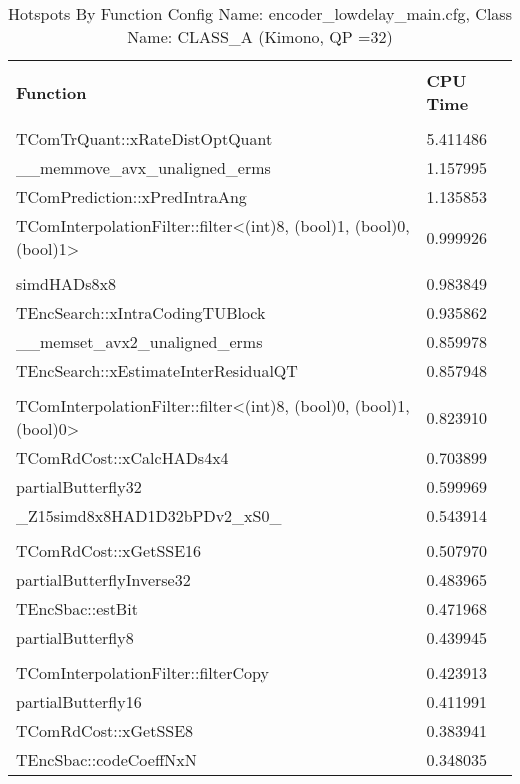 \documentclass{article}%
\begin{document}
\begin{longtabu}{| X[l] | X[l] |}%
\caption{%
Hotspots By Function\newline%
 Config Name: encoder\_lowdelay\_main.cfg,\newline%
 Class Name: CLASS\_A\newline%
 (Kimono, QP =32)%
}%
\hline%
&\\%
\textbf{Function}&\textbf{CPU Time}\\%
&\\%
\hline%
\endhead%
TComTrQuant::xRateDistOptQuant&5.411486\\%
\hline%
\_\_memmove\_avx\_unaligned\_erms&1.157995\\%
\hline%
TComPrediction::xPredIntraAng&1.135853\\%
\hline%
TComInterpolationFilter::filter<(int)8, (bool)1, (bool)0, (bool)1>&0.999926\\%
\hline%
&\\%
\hline%
simdHADs8x8&0.983849\\%
\hline%
TEncSearch::xIntraCodingTUBlock&0.935862\\%
\hline%
\_\_memset\_avx2\_unaligned\_erms&0.859978\\%
\hline%
TEncSearch::xEstimateInterResidualQT&0.857948\\%
\hline%
&\\%
\hline%
TComInterpolationFilter::filter<(int)8, (bool)0, (bool)1, (bool)0>&0.823910\\%
\hline%
TComRdCost::xCalcHADs4x4&0.703899\\%
\hline%
partialButterfly32&0.599969\\%
\hline%
\_Z15simd8x8HAD1D32bPDv2\_xS0\_&0.543914\\%
\hline%
&\\%
\hline%
TComRdCost::xGetSSE16&0.507970\\%
\hline%
partialButterflyInverse32&0.483965\\%
\hline%
TEncSbac::estBit&0.471968\\%
\hline%
partialButterfly8&0.439945\\%
\hline%
&\\%
\hline%
TComInterpolationFilter::filterCopy&0.423913\\%
\hline%
partialButterfly16&0.411991\\%
\hline%
TComRdCost::xGetSSE8&0.383941\\%
\hline%
TEncSbac::codeCoeffNxN&0.348035\\%
\hline%
\end{longtabu}%
\end{document}
